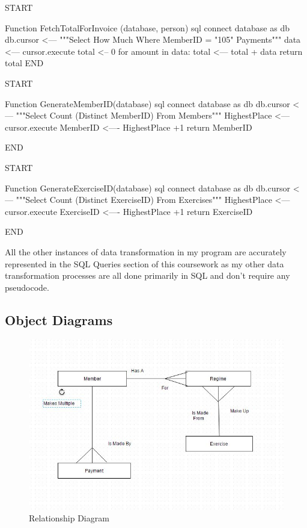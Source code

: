\begin{python}

START

Function FetchTotalForInvoice (database, person)
    sql connect database as db
    db.cursor <--- """Select How Much Where MemberID = "105" Payments"""
    data <--- cursor.execute
    total <-- 0
    for amount in data:
        total <--- total + data
    return total
END

START

Function GenerateMemberID(database)
    sql connect database as db
    db.cursor <--- """Select Count (Distinct MemberID) From Members"""
    HighestPlace <--- cursor.execute
    MemberID <---- HighestPlace +1
    return MemberID
    
END

START

Function GenerateExerciseID(database)
    sql connect database as db
    db.cursor <--- """Select Count (Distinct ExerciseID) From Exercises"""
    HighestPlace <--- cursor.execute
    ExerciseID <---- HighestPlace +1
    return ExerciseID
    
END

\end{python}

All the other instances of data transformation in my program are accurately represented in the SQL Queries section of this coursework as my other data transformation processes are all done primarily in SQL and don't require any pseudocode.

\subsection{Object Diagrams}

\begin{figure}[H]
    \includegraphics[width=\textwidth]{RelationshipDiagram1.jpg}
    \caption{Relationship Diagram} \label{fig: Relationship Diagram}
\end{figure}

